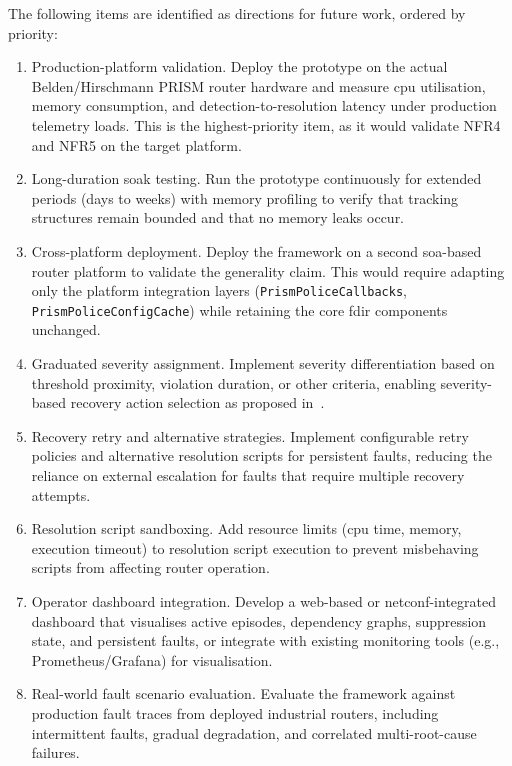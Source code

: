 The following items are identified as directions for future work, ordered by priority:

\begin{enumerate}
\item Production-platform validation.  
Deploy the prototype on the actual Belden/Hirschmann PRISM router hardware and measure \gls{cpu} utilisation, memory consumption, and detection-to-resolution latency under production telemetry loads. This is the highest-priority item, as it would validate NFR4 and NFR5 on the target platform.

\item Long-duration soak testing.  
Run the prototype continuously for extended periods (days to weeks) with memory profiling to verify that tracking structures remain bounded and that no memory leaks occur.

\item Cross-platform deployment.  
Deploy the framework on a second \gls{soa}-based router platform to validate the generality claim. This would require adapting only the platform integration layers (\texttt{PrismPoliceCallbacks}, \texttt{PrismPoliceConfigCache}) while retaining the core \gls{fdir} components unchanged.

\item Graduated severity assignment.  
Implement severity differentiation based on threshold proximity, violation duration, or other criteria, enabling severity-based recovery action selection as proposed in~\cite{Vitucci2022COMPSAC}.

\item Recovery retry and alternative strategies.  
Implement configurable retry policies and alternative resolution scripts for persistent faults, reducing the reliance on external escalation for faults that require multiple recovery attempts.

\item Resolution script sandboxing.  
Add resource limits (\gls{cpu} time, memory, execution timeout) to resolution script execution to prevent misbehaving scripts from affecting router operation.

\item Operator dashboard integration.  
Develop a web-based or \gls{netconf}-integrated dashboard that visualises active episodes, dependency graphs, suppression state, and persistent faults, or integrate with existing monitoring tools (e.g., Prometheus/Grafana) for visualisation.

\item Real-world fault scenario evaluation.  
Evaluate the framework against production fault traces from deployed industrial routers, including intermittent faults, gradual degradation, and correlated multi-root-cause failures.
\end{enumerate}